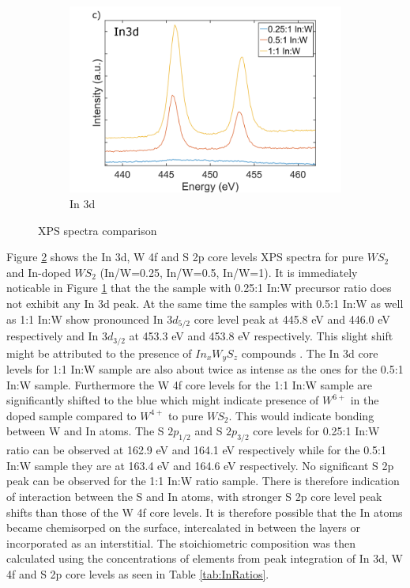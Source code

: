 \begin{figure}[!h]
\begin{center}
\begin{subfigure}[b]{0.6\textwidth}
			\includegraphics[width=\textwidth]{In/XPSIn3d.png}
			\caption{In 3d}
			\label{fig:InXPSIn3d}
		\end{subfigure}
		\caption{XPS spectra comparison}
		\label{fig:InXPSSpectra}
	\end{center}
\end{figure}

Figure \ref{fig:InXPSSpectra} shows the In 3d, W 4f and S 2p core levels XPS spectra for pure $WS_2$ and In-doped $WS_2$ (In/W=0.25, In/W=0.5, In/W=1). It is immediately noticable in Figure \ref{fig:InXPSIn3d} that the the sample with 0.25:1 In:W precursor ratio does not exhibit any In 3d peak. At the same time the samples with 0.5:1 In:W as well as 1:1 In:W show pronounced In $3d_{5/2}$ core level peak at 445.8 eV and 446.0 eV respectively and In $3d_{3/2}$ at 453.3 eV and 453.8 eV respectively. This slight shift might be attributed to the presence of $In_xW_yS_z$ compounds \cite{Wagner1991}. The In 3d core levels for 1:1 In:W sample are also about twice as intense as the ones for the 0.5:1 In:W sample. Furthermore the W 4f core levels for the 1:1 In:W sample are significantly shifted to the blue which might indicate presence of $W^{6+}$ in the doped sample compared to $W^{4+}$ to pure $WS_2$. This would indicate bonding between W and In atoms. The S $2p_{1/2}$ and S $2p_{3/2}$ core levels for 0.25:1 In:W ratio can be observed at 162.9 eV and 164.1 eV respectively while for the 0.5:1 In:W sample they are at 163.4 eV and 164.6 eV respectively. No significant S 2p peak can be observed for the 1:1 In:W ratio sample. There is therefore indication of interaction between the S and In atoms, with stronger S 2p core level peak shifts than those of the W 4f core levels. It is therefore possible that the In atoms became chemisorped on the surface, intercalated in between the layers or incorporated as an interstitial. The stoichiometric composition was then calculated using the concentrations of elements from peak integration of In 3d, W 4f and S 2p core levels as seen in Table \ref{tab:InRatios}.


